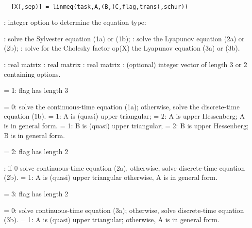 \begin{mandesc}
   \\ %
\end{mandesc}
\begin{calling_sequence}
\begin{verbatim}
  [X(,sep)] = linmeq(task,A,(B,)C,flag,trans(,schur))  
\end{verbatim}
\end{calling_sequence}
\begin{parameters}
  \begin{varlist}
    : integer option to determine the equation type:
    \begin{varlist}
      : solve the Sylvester equation (1a) or (1b);
      : solve the Lyapunov equation (2a) or (2b);
      : solve for the Cholesky factor op(X) the Lyapunov equation (3a) or (3b).
    \end{varlist}
    : real matrix
    : real matrix
    : real matrix
    : (optional) integer vector of length 3 or 2 containing options.
    \begin{varlist}
       = 1: flag has length 3
      \begin{varlist}
         = 0: solve the continuous-time equation (1a); otherwise, solve the discrete-time equation (1b).
         = 1: A is (quasi) upper triangular;
         = 2: A is upper Hessenberg;
         A is in general form.
         = 1: B is (quasi) upper triangular;
         = 2: B is upper Hessenberg;
         B is in general form.
      \end{varlist}
       = 2: flag has length 2
      \begin{varlist}
        : if 0 solve continuous-time equation
        (2a), otherwise, solve discrete-time equation (2b).
         = 1: A is (quasi) upper triangular     otherwise, A is in general form.
      \end{varlist}
       = 3: flag has length 2
      \begin{varlist}
         = 0: solve continuous-time equation (3a); otherwise, solve discrete-time equation (3b).
         = 1: A is (quasi) upper triangular; otherwise, A is in general form.

\end{varlist}
\end{varlist}
\end{varlist}
\end{parameters}
